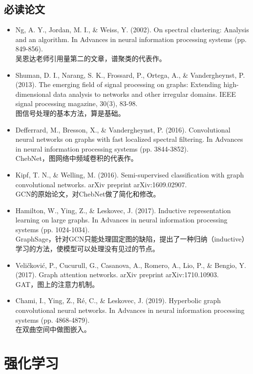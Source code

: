 \documentclass[lang=cn,11pt,a4paper]{elegant_template}
\begin{document}
\subsection{必读论文}
\begin{itemize}
    \item Ng, A. Y., Jordan, M. I., \& Weiss, Y. (2002). On spectral clustering: Analysis and an algorithm. In Advances in neural information processing systems (pp. 849-856). \\
 	吴恩达老师引用量第二的文章，谱聚类的代表作。 
 	\item Shuman, D. I., Narang, S. K., Frossard, P., Ortega, A., \& Vandergheynst, P. (2013). The emerging field of signal processing on graphs: Extending high-dimensional data analysis to networks and other irregular domains. IEEE signal processing magazine, 30(3), 83-98. \\
 	图信号处理的基本方法，算是基础。
 	\item Defferrard, M., Bresson, X., \& Vandergheynst, P. (2016). Convolutional neural networks on graphs with fast localized spectral filtering. In Advances in neural information processing systems (pp. 3844-3852). \\
 	ChebNet，图网络中频域卷积的代表作。
 	\item Kipf, T. N., \& Welling, M. (2016). Semi-supervised classification with graph convolutional networks. arXiv preprint arXiv:1609.02907. \\
 	GCN的原始论文，对ChebNet做了简化和修改。
 	\item Hamilton, W., Ying, Z., \& Leskovec, J. (2017). Inductive representation learning on large graphs. In Advances in neural information processing systems (pp. 1024-1034). \\
 	GraphSage，针对GCN只能处理固定图的缺陷，提出了一种归纳（inductive）学习的方法，使模型可以处理没有见过的节点。
 	\item Veličković, P., Cucurull, G., Casanova, A., Romero, A., Lio, P., \& Bengio, Y. (2017). Graph attention networks. arXiv preprint arXiv:1710.10903. \\
 	GAT，图上的注意力机制。
 	\item Chami, I., Ying, Z., Ré, C., \& Leskovec, J. (2019). Hyperbolic graph convolutional neural networks. In Advances in neural information processing systems (pp. 4868-4879). \\
 	在双曲空间中做图嵌入。
\end{itemize}

\section{强化学习}
\end{document}
